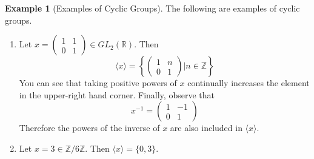 \documentclass[12pt]{article}
\theoremstyle{definition}
\newtheorem{example}{\color{WildStrawberry}Example}
\theoremstyle{definition}
\begin{document}
\begin{example}[Examples of Cyclic Groups] The following are examples of cyclic groups.
\begin{enumerate}
	\item Let $x = \begin{pmatrix} 1 & 1 \\ 0 & 1 \end{pmatrix} \in GL_2(\mathbb{R})$. Then
	\begin{equation}
		\langle x \rangle = \left\{ \begin{pmatrix} 1 & n \\ 0 & 1 \end{pmatrix} \Big\vert n \in \mathbb{Z} \right\}
	\end{equation}
	You can see that taking positive powers of $x$ continually increases the element in the upper-right hand corner. Finally, observe that 
	\begin{equation}
		x^{-1} = \begin{pmatrix} 1 & -1 \\ 0 & 1 \end{pmatrix}
	\end{equation}
	Therefore the powers of the inverse of $x$ are also included in $\langle x \rangle$.
	\item Let $x = 3 \in \mathbb{Z} / 6 \mathbb{Z}$. Then $\langle x \rangle = \{ 0, 3 \}$.
\end{enumerate}
\end{example}
\end{document}

